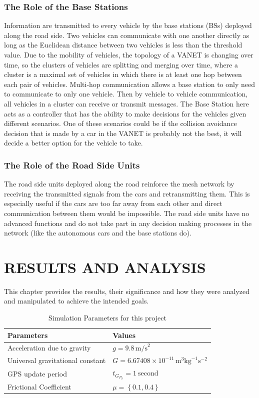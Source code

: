 \documentclass[12pt]{report}
\begin{document}
\subsection{The Role of the Base Stations}
Information are transmitted to every vehicle by the base stations (BSs) deployed along the road side. Two vehicles can communicate with one another directly as long as the Euclidean distance between two vehicles is less than the threshold value. 
Due to the mobility of vehicles, the topology of a VANET is changing over time, so the clusters of vehicles are splitting and merging over time, where a cluster is a maximal set of vehicles in which there is at least one hop between each pair of vehicles. Multi-hop communication allows a base station to only need to communicate to only one vehicle. Then by vehicle to vehicle communication, all vehicles in a cluster can receive or transmit messages.
The Base Station here acts as a controller that has the ability to make decisions for the vehicles given different scenarios. One of these scenarios could be if the collision avoidance decision that is made by a car in the VANET is probably not the best, it will decide a better option for the vehicle to take.

\subsection{The Role of the Road Side Units}
The road side units deployed along the road reinforce the mesh network by receiving the transmitted signals from the cars and retransmitting them. This is especially useful if the cars are too far away from each other and direct communication between them would be impossible. The road side units have no advanced functions and do not take part in any decision making processes in the network (like the autonomous cars and the base stations do).




\chapter{RESULTS AND ANALYSIS}

This chapter provides the results, their significance and how they were analyzed and manipulated to achieve the intended goals. 

\begin{table}[H]
\caption{Simulation Parameters for this project} %
\centering %
    \begin{tabular}{| l | l |}
	 \hline\hline
    Parameters & Values \\ \hline
    Acceleration due to gravity &  $g = 9.8\,\text{m/s}^2$ \\ \hline
    Universal gravitational constant &  $G = 6.67408 \times 10^{-{1{1}}}\, \text{m}^3 \text{kg}^{-{1}} \text{s}^{-{2}}$ \\ \hline
	GPS update period &  $ t_{G_{P_{S}}} = 1\  \text{second}$  \\ \hline	
    Frictional Coefficient & $\mu = \left\{0.1, 0.4\right\}$\\\hline		
\end{tabular}
\end{table}
\end{document}
